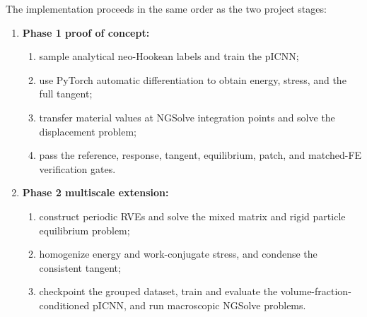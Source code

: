 The implementation proceeds in the same order as the two project stages:
\begin{enumerate}
  \item \textbf{Phase 1 proof of concept:}
    \begin{enumerate}[label=\alph*)]
      \item sample analytical neo-Hookean labels and train the pICNN;
      \item use PyTorch automatic differentiation to obtain energy, stress,
            and the full tangent;
      \item transfer material values at NGSolve integration points and solve
            the displacement problem;
      \item pass the reference, response, tangent, equilibrium, patch, and
            matched-FE verification gates.
    \end{enumerate}
  \item \textbf{Phase 2 multiscale extension:}
    \begin{enumerate}[label=\alph*)]
      \item construct periodic RVEs and solve the mixed matrix and rigid
            particle equilibrium problem;
      \item homogenize energy and work-conjugate stress, and condense the
            consistent tangent;
      \item checkpoint the grouped dataset, train and evaluate the
            volume-fraction-conditioned pICNN, and run macroscopic NGSolve
            problems.
    \end{enumerate}
\end{enumerate}

